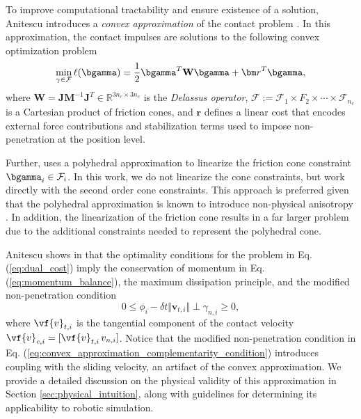 To improve computational tractability and ensure existence of a solution,
Anitescu introduces a \textit{convex approximation} of the contact problem
\cite{bib:anitescu2006}. In this approximation, the contact impulses are
solutions to the following convex optimization problem
\begin{eqnarray}
	\min_{\gamma\in \mathcal{F}} \ell(\bgamma) =
	\frac{1}{2}\bgamma^T\mathbf{W}\bgamma + {\bm r}^T \bgamma,
	\label{eq:dual_cost}
\end{eqnarray}
where $\mathbf{W} =
\mathbf{J}\mathbf{M}^{-1}\mathbf{J}^T\in\mathbb{R}^{3n_c\times 3n_c}$ is the
\emph{Delassus operator}, $\mathcal{F} := \mathcal{F}_1 \times F_2 \times \cdots
\times \mathcal{F}_{n_c}$ is a Cartesian product of friction cones, and ${\bm
r}$ defines a linear cost that encodes external force contributions and
stabilization terms used to impose non-penetration at the position level.

Further, \cite{bib:anitescu2006} uses a polyhedral approximation to linearize
the friction cone constraint $\bgamma_i\in\mathcal{F}_i$. In this work, we do
not linearize the cone constraints, but work directly with the second order cone
constraints. This approach is preferred given that the polyhedral approximation
is known to introduce non-physical anisotropy \cite{bib:li2018implicit}. In
addition, the linearization of the friction cone results in a far larger problem
due to the additional constraints needed to represent the polyhedral cone.

Anitescu shows in \cite{bib:anitescu2006} that the optimality conditions for the
problem in Eq. (\ref{eq:dual_cost}) imply the conservation of momentum in Eq.
(\ref{eq:momentum_balance}), the maximum dissipation principle, and the modified
non-penetration condition
\begin{equation}
	0 \le \phi_i - \delta t \Vert {\bm v}_{t,i} \Vert \perp \gamma_{n,i} \ge 0,
	\label{eq:convex_approximation_complementarity_condition}
\end{equation}
where $\vf{v}_{t,i}$ is the tangential component of the contact velocity
$\vf{v}_{c,i} = [\vf{v}_{t,i}\,v_{n,i}]$. Notice that the modified
non-penetration condition in Eq.
(\ref{eq:convex_approximation_complementarity_condition}) introduces coupling
with the sliding velocity, an artifact of the convex approximation. We provide a
detailed discussion on the physical validity of this approximation in Section
\ref{sec:physical_intuition}, along with guidelines for determining its
applicability to robotic simulation.

